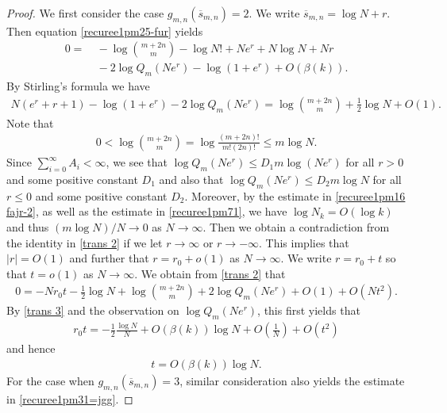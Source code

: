 \documentclass[12pt]{amsart}
\numberwithin{equation}{section}
\begin{document}
\begin{proof}
We first consider the case $g_{m,n}(\overline{s}_{m,n})=2$. We write $\overline{s}_{m,n}=\log N+r$. Then equation \eqref{recuree1pm25-fur} yields
\begin{equation*}
\begin{split}
0=&\ -\log \binom{m+2n}{m}-\log N!+Ne^r+N\log N+Nr\\
&\ -2\log Q_m(Ne^r)-\log(1+e^r)+O(\beta(k)).
\end{split}
\end{equation*}
By Stirling's formula we have
\begin{equation}\label{trans 2}
\begin{split}
N(e^r+r+1)-\log(1+e^r)-2\log Q_m(Ne^r)=\log\binom{m+2n}{m}+\frac{1}{2}\log N+O(1).
\end{split}
\end{equation}
Note that
\begin{equation}\label{trans 3}
\begin{split}
0<\log \binom{m+2n}{m}=\log\frac{(m+2n)!}{m!(2n)!}\leq m\log N.
\end{split}
\end{equation}
Since $\sum_{i=0}^{\infty}A_i<\infty$, we see that $\log Q_m(Ne^r) \leq D_1m\log (Ne^{r})$ for all $r>0$ and some positive constant $D_1$ and also that $\log Q_m(Ne^r)\leq D_2m\log N$ for all $r\leq 0$ and some positive constant $D_2$. Moreover, by the estimate in \eqref{recuree1pm16  fajr-2}, as well as the estimate in \eqref{recuree1pm71}, we have $\log N_k=O(\log k)$ and thus $(m\log N)/N\to 0$ as $N\to\infty$. Then we obtain a contradiction from the identity in \eqref{trans 2} if we let $r\to\infty$ or $r\to-\infty$. This implies that $|r|=O(1)$ and further that $r=r_0+o(1)$ as $N\to\infty$. We write $r=r_0+t$ so that $t=o(1)$ as $N\to\infty$. We obtain from \eqref{trans 2} that
\begin{equation}\label{trans 4}
\begin{split}
0=-Nr_0t-\frac{1}{2}\log N+\log\binom{m+2n}{m}+2\log Q_m(Ne^r)+O(1)+O(Nt^2).
\end{split}
\end{equation}
By \eqref{trans 3} and the observation on $\log Q_m(Ne^r)$, this first yields that
\begin{equation*}%
\begin{split}
r_0t=-\frac{1}{2}\frac{\log N}{N}+O(\beta(k))\log N+O\left(\frac{1}{N}\right)+O(t^2)
\end{split}
\end{equation*}
and hence
\begin{equation*}%
\begin{split}
t=O(\beta(k))\log N.
\end{split}
\end{equation*}
For the case when $g_{m,n}(\overline{s}_{m,n})=3$, similar consideration also yields the estimate in \eqref{recuree1pm31=jgg}.
\end{proof}
\end{document}
